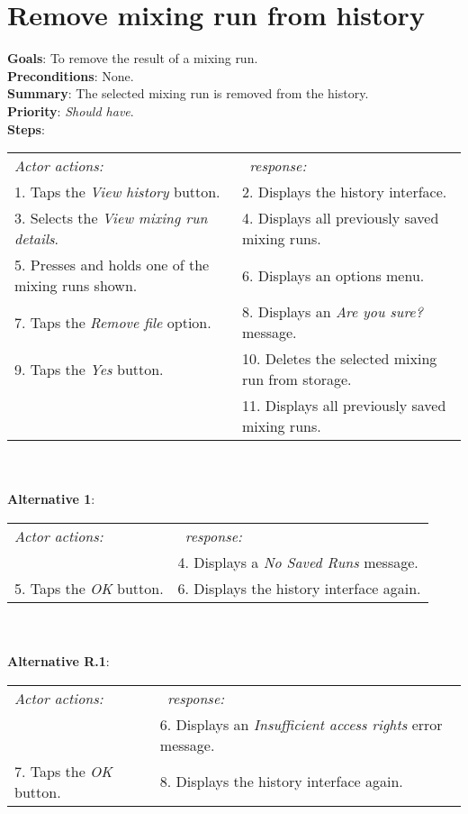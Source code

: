 \section{Remove mixing run from history}
 \label{removemixrun}
  \textbf{Goals}: To remove the result of a mixing run.\\
  \textbf{Preconditions}: None.\\
  \textbf{Summary}: The selected mixing run is removed from the history.\\
  \textbf{Priority}: \emph{Should have}.\\
  \textbf{Steps}: \\
    \begin{tabular}{ p{} p{} }
  	\emph{Actor actions:} & \emph{\projectname\ response:} \\
    1. Taps the \emph{View history} button. & 2. Displays the history interface.\\
    3. Selects the \emph{View mixing run details}. & 4. Displays all previously saved mixing runs.\\
    5. Presses and holds one of the mixing runs shown. & 6. Displays an options menu. \\
    7. Taps the \emph{Remove file} option. & 8. Displays an \emph{Are you sure?} message.\\
    9. Taps the \emph{Yes} button. & 10. Deletes the selected mixing run from storage. \\
     & 11. Displays all previously saved mixing runs.
    \end{tabular}
            \\
     \\\textbf{Alternative 1}: \\
    \begin{tabular}{ p{} p{} }
  	\emph{Actor actions:} & \emph{\projectname\ response:} \\
            & 4. Displays a \emph{No Saved Runs} message. \\
    5. Taps the \emph{OK} button. & 6. Displays the history interface again. \\
    \end{tabular}
    \\
     \\\textbf{Alternative R.1}: \\
    \begin{tabular}{ p{} p{} }
  	\emph{Actor actions:} & \emph{\projectname\ response:} \\
            & 6. Displays an \emph{Insufficient access rights} error message. \\
    7. Taps the \emph{OK} button. & 8. Displays the history interface again. \\
    \end{tabular}
